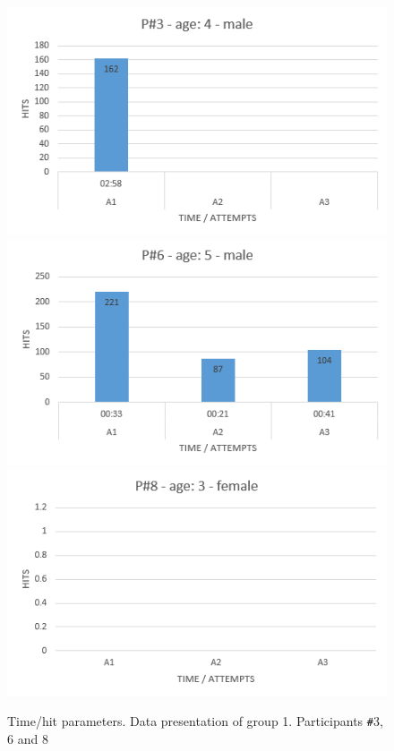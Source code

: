 \begin{figure}[!ht]

    \centering
    \includegraphics[width=.6\textwidth]{figures/p3.png}
    \includegraphics[width=.6\textwidth]{figures/p6.png}
        \includegraphics[width=.6\textwidth]{figures/p8.png}
    \caption{Time/hit parameters. Data presentation of group 1. Participants \texttt{\#}3, 6 and 8}
    \label{fig:agegroup1}
\end{figure}

